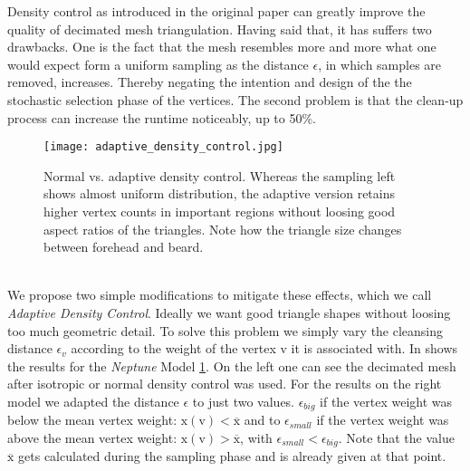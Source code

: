 Density control as introduced in the original paper can greatly improve the quality of decimated mesh triangulation.
Having said that, it has suffers two drawbacks. 
One is the fact that the mesh resembles more and more what one would expect form a uniform sampling as the distance $\epsilon$, in which samples are removed, increases. 
Thereby negating the intention and design of the the stochastic selection phase of the vertices.
The second problem is that the clean-up process can increase the runtime noticeably, up to 50\%.
\begin{figure}[ht]
\centering
\texttt{[image: adaptive\_density\_control.jpg]}
\caption{Normal vs. adaptive density control. Whereas the sampling left shows almost uniform distribution, the adaptive version retains higher vertex counts in important regions without loosing good aspect ratios of the triangles. Note how the triangle size changes between forehead and beard.}
\label{fig:adaptive_density_control}
\end{figure}\\
We propose two simple modifications to mitigate these effects, which we call \textit{Adaptive Density Control}.
Ideally we want good triangle shapes without loosing too much geometric detail.
To solve this problem we simply vary the cleansing distance $\epsilon_{v}$ according to the weight of the vertex $\mathrm{v}$ it is associated with.
In shows the results for the \textit{Neptune} Model \ref{fig:adaptive_density_control}.
On the left one can see the decimated mesh after isotropic or normal density control was used.
For the results on the right model we adapted the distance $\epsilon$ to just two values.
$\epsilon_{big}$ if the vertex weight was below the mean vertex weight: $\mathrm{x}(\mathrm{v}) < \overline{\mathrm{x}}$ and to $\epsilon_{small}$ if the vertex weight was above the mean vertex weight: $\mathrm{x}(\mathrm{v}) > \overline{\mathrm{x}}$, with $\epsilon_{small} < \epsilon_{big}$.
Note that the value $\overline{\mathrm{x}}$ gets calculated during the sampling phase and is already given at that point.

